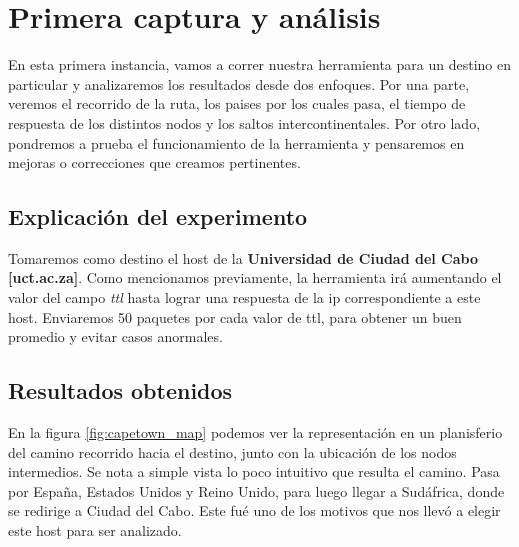 \section{Primera captura y análisis}
\par En esta primera instancia, vamos a correr nuestra herramienta para un destino en particular y analizaremos los resultados desde dos enfoques. Por una parte, veremos el recorrido de la ruta, los paises por los cuales pasa, el tiempo de respuesta de los distintos nodos y los saltos intercontinentales. Por otro lado, pondremos a prueba el funcionamiento de la herramienta y pensaremos en mejoras o correcciones que creamos pertinentes.

\subsection{Explicación del experimento}
\par Tomaremos como destino el host de la \textbf{Universidad de Ciudad del Cabo [uct.ac.za]}. Como mencionamos previamente, la herramienta irá aumentando el valor del campo \textit{ttl} hasta lograr una respuesta de la ip correspondiente a este host. Enviaremos 50 paquetes por cada valor de ttl, para obtener un buen promedio y evitar casos anormales.

\subsection{Resultados obtenidos}
\par En la figura \ref{fig:capetown_map} podemos ver la representación en un planisferio del camino recorrido hacia el destino, junto con la ubicación de los nodos intermedios. Se nota a simple vista lo poco intuitivo que resulta el camino. Pasa por España, Estados Unidos y Reino Unido, para luego llegar a Sudáfrica, donde se redirige a Ciudad del Cabo. Este fué uno de los motivos que nos llevó a elegir este host para ser analizado.

